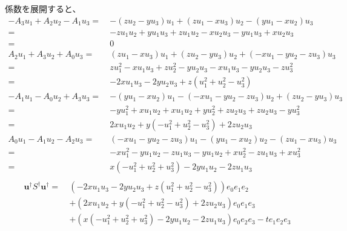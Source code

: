 \documentclass[a4paper,12pt,notitlepage]{jsreport}
\begin{document}
係数を展開すると、
\begin{equation}
  \begin{split}
    - A_3 u_1 + A_2 u_2 - A_1 u_3 = ~ & - (z u_2 - y u_3) u_1 + (z u_1 - x u_3) u_2 - (y u_1 - x u_2) u_3 \\
    = ~ & - z u_1 u_2 + y u_1 u_3 + z u_1 u_2 - x u_2 u_3 - y u_1 u_3 + x u_2 u_3 \\
    = ~ & 0 \\
    A_2 u_1 + A_3 u_2 + A_0 u_3 = ~ & (z u_1 - x u_3) u_1 + (z u_2 - y u_3) u_2 + (- x u_1 - y u_2 - z u_3) u_3 \\
    = ~ & z u_1^2 - x u_1 u_3 + z u_2^2 - y u_2 u_3 - x u_1 u_3 - y u_2 u_3 - z u_3^2 \\
    = ~ & - 2 x u_1 u_3 - 2 y u_2 u_3 + z (u_1^2 + u_2^2 - u_3^2) \\
    - A_1 u_1 - A_0 u_2 + A_3 u_3 = ~ & - (y u_1 - x u_2) u_1 - (- x u_1 - y u_2 - z u_3) u_2 + (z u_2 - y u_3) u_3 \\
    = ~ & - y u_1^2 + x u_1 u_2 + x u_1  u_2 + y u_2^2 + z u_2 u_3 + z u_2 u_3 - y u_3^2 \\
    = ~ & 2 x u_1 u_2 + y ( - u_1^2 + u_2^2 - u_3^2) + 2 z u_2 u_3 \\
    A_0 u_1 - A_1 u_2 - A_2 u_3 = ~ & (- x u_1 - y u_2 - z u_3) u_1 - (y u_1 - x u_2) u_2 - (z u_1 - x u_3) u_3 \\
    = ~ & - x u_1^2 - y u_1 u_2 - z u_1 u_3 - y u_1 u_2 + x u_2^2 - z u_1 u_3 + x u_3^2 \\
    = ~ & x ( - u_1^2 + u_2^2 + u_3^2) - 2 y u_1 u_2 - 2 z u_1 u_3 \\
  \end{split}
\end{equation}
\begin{equation}
  \begin{split}
    \bm{u}^\dag S^\dag \bm{u}^\dag
    = ~ & (- 2 x u_1 u_3 - 2 y u_2 u_3 + z (u_1^2 + u_2^2 - u_3^2)) e_0e_1e_2 \\
    & + (2 x u_1 u_2 + y ( - u_1^2 + u_2^2 - u_3^2) + 2 z u_2 u_3) e_0e_1e_3 \\
    & + (x ( - u_1^2 + u_2^2 + u_3^2) - 2 y u_1 u_2 - 2 z u_1 u_3) e_0e_2e_3 - t e_1e_2e_3 \\
  \end{split}
\end{equation}
\end{document}
